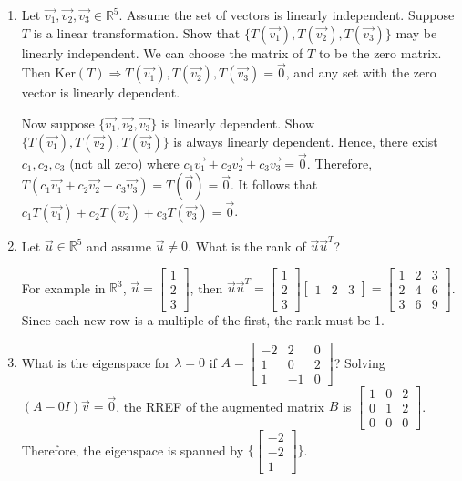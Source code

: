 \documentclass{article}
\begin{document}
\begin{enumerate}
    \item Let $\vec{v_1}, \vec{v_2}, \vec{v_3} \in \mathbb{R}^5$. Assume the set of vectors is linearly independent. Suppose $T$ is a linear transformation. Show that $\{T(\vec{v_1}), T(\vec{v_2}), T(\vec{v_3})\}$ may be linearly independent. We can choose the matrix of $T$ to be the zero matrix. Then $\text{Ker}(T) \Rightarrow T(\vec{v_1}), T(\vec{v_2}), T(\vec{v_3}) = \vec{0}$, and any set with the zero vector is linearly dependent.

    Now suppose $\{\vec{v_1}, \vec{v_2}, \vec{v_3}\}$ is linearly dependent. Show $\{T(\vec{v_1}), T(\vec{v_2}), T(\vec{v_3})\}$ is always linearly dependent. Hence, there exist $c_1, c_2, c_3$ (not all zero) where $c_1\vec{v_1} + c_2\vec{v_2} + c_3\vec{v_3} = \vec{0}$. Therefore, $T(c_1\vec{v_1} + c_2\vec{v_2} + c_3\vec{v_3}) = T(\vec{0}) = \vec{0}$. It follows that $c_1T(\vec{v_1}) + c_2T(\vec{v_2}) + c_3T(\vec{v_3}) = \vec{0}$.

    \item Let $\vec{u} \in \mathbb{R}^5$ and assume $\vec{u} \neq 0$. What is the rank of $\vec{u}\vec{u}^T$?

    For example in $\mathbb{R}^3$, $\vec{u} = \begin{bmatrix} 1 \\ 2 \\ 3 \end{bmatrix}$, then $\vec{u}\vec{u}^T = \begin{bmatrix} 1 \\ 2 \\ 3 \end{bmatrix} \begin{bmatrix} 1 & 2 & 3 \end{bmatrix} = \begin{bmatrix} 1 & 2 & 3 \\ 2 & 4 & 6 \\ 3 & 6 & 9 \end{bmatrix}$. Since each new row is a multiple of the first, the rank must be 1.

    \item What is the eigenspace for $\lambda = 0$ if $A = \begin{bmatrix} -2 & 2 & 0 \\ 1 & 0 & 2 \\ 1 & -1 & 0 \end{bmatrix}$? Solving $(A - 0I)\vec{v} = \vec{0}$, the RREF of the augmented matrix $B$ is $\begin{bmatrix} 1 & 0 & 2 \\ 0 & 1 & 2 \\ 0 & 0 & 0 \end{bmatrix}$. Therefore, the eigenspace is spanned by $\{ \begin{bmatrix} -2 \\ -2 \\ 1 \end{bmatrix} \}$.


\end{enumerate}
\end{document}
